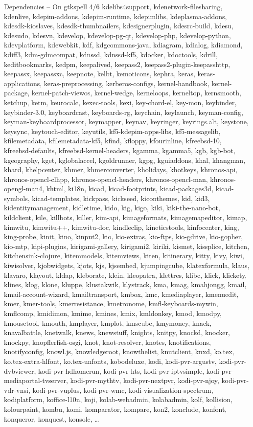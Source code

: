 \documentclass{beamer}
\begin{document}
\begin{frame}{Dependencies – On gtkspell 4/6}
\tiny kdelibs4support, kdenetwork-filesharing, kdenlive, kdepim-addons, kdepim-runtime, kdepimlibs, kdeplasma-addons, kdesdk-kioslaves, kdesdk-thumbnailers, kdesignerplugin, kdesrc-build, kdesu, kdesudo, kdesvn, kdevelop, kdevelop-pg-qt, kdevelop-php, kdevelop-python, kdevplatform, kdewebkit, kdf, kdgcommons-java, kdiagram, kdialog, kdiamond, kdiff3, kdm-gdmcompat, kdnssd, kdnssd-kf5, kdocker, kdoctools, kdrill, keditbookmarks, kedpm, keepalived, keepass2, keepass2-plugin-keepasshttp, keepassx, keepassxc, keepnote, kelbt, kemoticons, kephra, keras, keras-applications, keras-preprocessing, kerberos-configs, kernel-handbook, kernel-package, kernel-patch-viewos, kernel-wedge, kerneloops, kerneltop, kernsmooth, ketchup, ketm, keurocalc, kexec-tools, kexi, key-chord-el, key-mon, keybinder, keybinder-3.0, keyboardcast, keyboards-rg, keychain, keylaunch, keyman-config, keyman-keyboardprocessor, keymapper, keynav, keyringer, keyrings.alt, keystone, keysync, keytouch-editor, keyutils, kf5-kdepim-apps-libs, kf5-messagelib, kfilemetadata, kfilemetadata-kf5, kfind, kfloppy, kfourinline, kfreebsd-10, kfreebsd-defaults, kfreebsd-kernel-headers, kgamma, kgamma5, kgb, kgb-bot, kgeography, kget, kglobalaccel, kgoldrunner, kgpg, kguiaddons, khal, khangman, khard, khelpcenter, khmer, khmerconverter, kholidays, khotkeys, khronos-api, khronos-opencl-clhpp, khronos-opencl-headers, khronos-opencl-man, khronos-opengl-man4, khtml, ki18n, kicad, kicad-footprints, kicad-packages3d, kicad-symbols, kicad-templates, kickpass, kickseed, kiconthemes, kid, kid3, kidentitymanagement, kidletime, kido, kig, kigo, kiki, kiki-the-nano-bot, kildclient, kile, killbots, killer, kim-api, kimageformats, kimagemapeditor, kimap, kimwitu, kimwitu++, kimwitu-doc, kindleclip, kineticstools, kinfocenter, king, king-probe, kinit, kino, kinput2, kio, kio-extras, kio-ftps, kio-gdrive, kio-gopher, kio-mtp, kipi-plugins, kirigami-gallery, kirigami2, kiriki, kismet, kissplice, kitchen, kitchensink-clojure, kitemmodels, kitemviews, kiten, kitinerary, kitty, kivy, kiwi, kiwisolver, kjobwidgets, kjots, kjs, kjsembed, kjumpingcube, klatexformula, klaus, klavaro, klayout, kldap, kleborate, klein, kleopatra, klettres, klibc, klick, klickety, klines, klog, klone, kluppe, klustakwik, klystrack, kma, kmag, kmahjongg, kmail, kmail-account-wizard, kmailtransport, kmbox, kmc, kmediaplayer, kmenuedit, kmer, kmer-tools, kmerresistance, kmetronome, kmfl-keyboards-mywin, kmflcomp, kmidimon, kmime, kmines, kmix, kmldonkey, kmod, kmodpy, kmousetool, kmouth, kmplayer, kmplot, kmscube, kmymoney, knack, knavalbattle, knetwalk, knews, knewstuff, knights, knitpy, knockd, knocker, knockpy, knopflerfish-osgi, knot, knot-resolver, knotes, knotifications, knotifyconfig, knowl.js, knowledgeroot, knowthelist, knutclient, knxd, ko.tex, ko.tex-extra-hlfont, ko.tex-unfonts, kobodeluxe, kodi, kodi-pvr-argustv, kodi-pvr-dvbviewer, kodi-pvr-hdhomerun, kodi-pvr-hts, kodi-pvr-iptvsimple, kodi-pvr-mediaportal-tvserver, kodi-pvr-mythtv, kodi-pvr-nextpvr, kodi-pvr-njoy, kodi-pvr-vdr-vnsi, kodi-pvr-vuplus, kodi-pvr-wmc, kodi-visualization-spectrum, kodiplatform, koffice-l10n, koji, kolab-webadmin, kolabadmin, kolf, kollision, kolourpaint, kombu, komi, komparator, kompare, kon2, konclude, konfont, konqueror, konquest, konsole, …

\end{frame}
\end{document}
